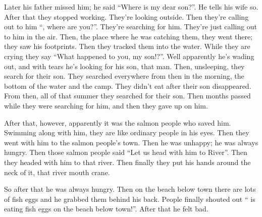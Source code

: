 \begin{pairs}
\begin{Rightside}
\pstart
{}Later his father missed him;
he said “Whe\-re is my dear son?”.
He tells his wife so.
After that they stopped working.
They’re looking outside.
Then they’re calling out to him
\qqk{}“, where are you?”.
They’re searching for him.
They’re just calling out to him in the air.
Then, the place where he was catching them, they went there;
they saw his footprints.
Then they tracked them into the water.
While they are crying they say
\qqk{}“What happened to you, my son!?”.
Well apparently he’s wading out,
and with tears he’s looking for his son, that man.
Then, unsleeping, they search for their son.
They searched everywhere from then in the morning, the bottom of the water and the camp.
They didn’t eat after their son disappeared.
From then, all of that summer they searched for their son.
Then months passed while they were searching for him, and then they gave up on him.
\pend

\pstart
{}After that,  however, apparently it was the salmon people who saved him.
Swimming along with him, they are like ordinary people in his eyes.
Then they went with him to the salmon people’s town.
Then he was unhappy;
he was always hungry.
Then those salmon people said
\qqk{}“Let us head with him to  River”.
Then they head\-ed with him to that river.
Then finally they put his hands around the neck of it, that river mouth crane.
\pend

\pstart
{}So after that he was always hungry.
Then on the beach below town there are lots of fish eggs and he grabbed them behind his back.
People finally shouted out
\qqk{}“ is eating fish eggs on the beach below town!”.
After that he felt bad.
\pend


\end{Rightside}
\end{pairs}
